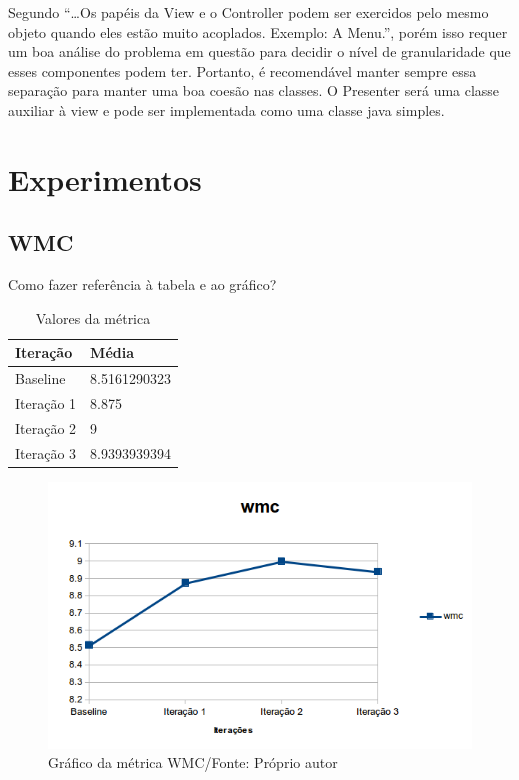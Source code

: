 Segundo  ``\ldots Os papéis da View e o
Controller podem ser exercidos pelo mesmo objeto quando eles estão muito
acoplados. Exemplo: A Menu.'', porém isso requer um boa análise do problema em
questão para decidir o nível de granularidade que esses componentes podem ter.
Portanto, é recomendável manter sempre essa separação para manter uma boa coesão
nas classes. O Presenter será uma classe auxiliar à view e pode ser implementada
como uma classe java simples. 



\section{Experimentos}



\subsection{WMC}

Como fazer referência à tabela e ao gráfico?
\begin{table}[h]
	\centering
    \begin{tabular}{ | l | l | }
    \hline
    Iteração & Média 			\\ \hline
    Baseline & 8.5161290323   	\\ \hline
    Iteração 1 & 8.875			\\ \hline
	Iteração 2 & 9				\\ \hline
	Iteração 3 & 8.9393939394	\\ \hline
    \end{tabular}
    \caption{Valores da métrica}
    \label{tab:dados_iteracao1}
\end{table}

\begin{figure}[h]
	\centering
	\includegraphics{img/wmc.png}
	\caption{Gráfico da métrica WMC/Fonte: Próprio autor} 
	\label{fig:wmc}
\end{figure}


